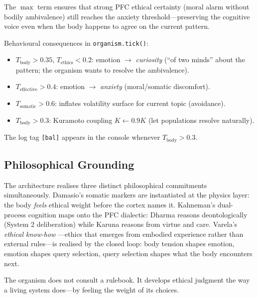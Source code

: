 \documentclass[11pt,a4paper,twocolumn]{article}
\begin{document}
The $\max$ term ensures that strong PFC ethical certainty (moral alarm without bodily ambivalence)
still reaches the anxiety threshold---preserving the cognitive voice even when the body happens to
agree on the current pattern.

Behavioural consequences in \texttt{organism.tick()}:
\begin{itemize}
\item $T_{\text{body}} > 0.35$, $T_{\text{ethics}} < 0.2$: emotion $\to$ \emph{curiosity}
  (``of two minds'' about the pattern; the organism wants to resolve the ambivalence).
\item $T_{\text{effective}} > 0.4$: emotion $\to$ \emph{anxiety} (moral/somatic discomfort).
\item $T_{\text{somatic}} > 0.6$: inflates volatility surface for current topic (avoidance).
\item $T_{\text{body}} > 0.3$: Kuramoto coupling $K \leftarrow 0.9K$ (let populations resolve naturally).
\end{itemize}

The log tag \texttt{[bal]} appears in the console whenever $T_{\text{body}} > 0.3$.

\subsection{Philosophical Grounding}

The architecture realises three distinct philosophical commitments simultaneously.
Damasio's somatic markers \citep{damasio1999} are instantiated at the physics layer:
the body \emph{feels} ethical weight before the cortex names it.
Kahneman's dual-process cognition \citep{kahneman2011} maps onto the PFC dialectic:
Dharma reasons deontologically (System 2 deliberation) while Karuna reasons from virtue and care.
Varela's \emph{ethical know-how} \citep{varela1999ethical}---ethics that emerges from embodied
experience rather than external rules---is realised by the closed loop:
body tension shapes emotion, emotion shapes query selection, query selection shapes what the body
encounters next.

The organism does not consult a rulebook. It develops ethical judgment the way a living system
does---by feeling the weight of its choices.


\end{document}
